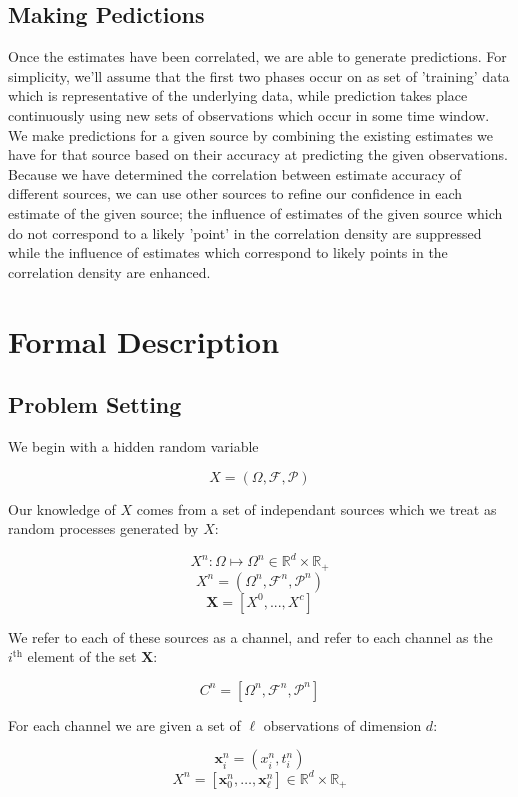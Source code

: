 \documentclass[10pt]{article}
\begin{document}
\subsection{Making Pedictions}
Once the estimates have been correlated, we are able to generate predictions.  For simplicity, we'll assume that the first two phases occur on as set of 'training' data which is representative of the underlying data, while prediction takes place continuously using new sets of observations which occur in some time window.  We make predictions for a given source by combining the existing estimates we have for that source based on their accuracy at predicting the given observations.  Because we have determined the correlation between estimate accuracy of different sources, we can use other sources to refine our confidence in each estimate of the given source; the influence of estimates of the given source which do not correspond to a likely 'point' in the correlation density are suppressed while the influence of estimates which correspond to likely points in the correlation density are enhanced.

\section{Formal Description}

\subsection{Problem Setting}
We begin with a hidden random variable 

\[ X = (\Omega,\mathcal{F},\mathcal{P}) \]

Our knowledge of \( X \) comes from a set of independant sources which we treat as random processes generated by \( X \):

\[ X^n : \Omega \mapsto \Omega^n \in \mathbb{R}^d \times \mathbb{R}_+  \]
\[ X^n = (\Omega^n,\mathcal{F}^n,\mathcal{P}^n) \]
\[ \mathbf{X} = [X^0,...,X^c]   \]

We refer to each of these sources as a channel, and refer to each channel as the \( i^\text{th} \) element of the set \( \mathbf{X} \):

\[ C^n = [\Omega^n,\mathcal{F}^n,\mathcal{P}^n] \]

For each channel we are given a set of \( \ell \) observations of dimension \( d \):

\[ \mathbf{x}_i^n = (x_i^n, t_i^n ) \]
\[ X^n = \left[ \mathbf{x}_0^n,\hdots,\mathbf{x}_\ell^n \right] \in \mathbb{R}^d \times \mathbb{R}_+ \]
\end{document}

